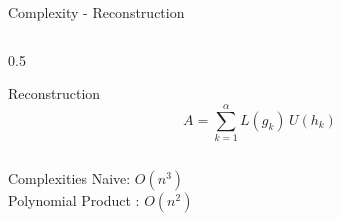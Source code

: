 \begin{frame}{Complexity - Reconstruction}
  \begin{columns}
    \begin{column}{0.5\textwidth}
      \begin{block}{Reconstruction}
        \[
          A = \sum_{k=1}^{\alpha} L(g_k)\, U(h_k)
        \]
      \end{block}
    \end{column}
  \end{columns}

  \vspace{1cm}

  \begin{block}{Complexities}
    Naive: $O(n^3)$           \\
    Polynomial Product : $O(n^2)$
  \end{block}

\end{frame}
